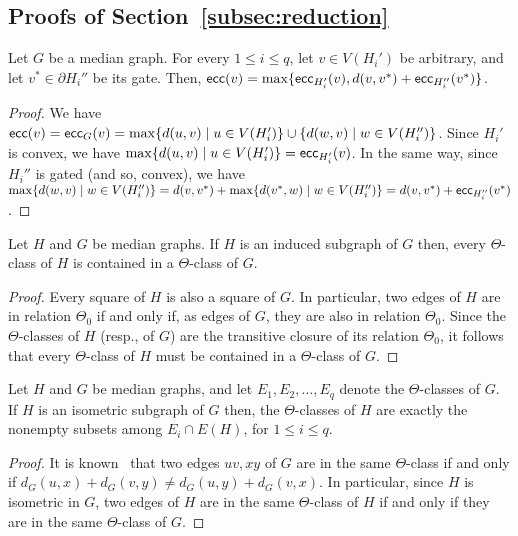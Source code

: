 \documentclass[a4paper,UKenglish,numberwithinsect,cleveref, autoref,anonymous]{lipics-v2021}
\newcommand{\ecc}{\mbox{\textsf{ecc}}}
\begin{document}
\subsection{Proofs of Section~\ref{subsec:reduction}} \label{asubsec:reduction}

\begin{lemma}\label{lem:guigui-1}
Let $G$ be a median graph.
For every $1 \leq i \leq q$, let $v \in V(H_i')$ be arbitrary, and let $v^* \in \partial H_i''$ be its gate.
Then, $\ecc(v) = \max\{\ecc_{H_i'}(v), d(v,v^*) + \ecc_{H_i''}(v^*)\}$.
\end{lemma}
\begin{proof}
We have $\ecc(v) = \ecc_G(v) = \max\{d(u,v) \mid u \in V(H_i')\} \cup \{d(w,v) \mid w \in V(H_i'')\}$.
Since $H_i'$ is convex, we have $\max\{d(u,v) \mid u \in V(H_i')\} = \ecc_{H_i'}(v)$.
In the same way, since $H_i''$ is gated (and so, convex), we have $\max\{d(w,v) \mid w \in V(H_i'')\} = d(v,v^*) + \max\{d(v^*,w) \mid w \in V(H_i'')\} = d(v,v^*) + \ecc_{H_i''}(v^*)$.
\end{proof}

\begin{lemma}\label{lem:guigui-2}
Let $H$ and $G$ be median graphs.
If $H$ is an induced subgraph of $G$ then, every $\Theta$-class of $H$ is contained in a $\Theta$-class of $G$.
\end{lemma}
\begin{proof}
Every square of $H$ is also a square of $G$.
In particular, two edges of $H$ are in relation $\Theta_0$ if and only if, as edges of $G$, they are also in relation $\Theta_0$.
Since the $\Theta$-classes of $H$ (resp., of $G$) are the transitive closure of its relation $\Theta_0$, it follows that every $\Theta$-class of $H$ must be contained in a $\Theta$-class of $G$.
\end{proof}

\begin{lemma}\label{lem:guigui-2bis}
Let $H$ and $G$ be median graphs, and let $E_1,E_2,\ldots,E_q$ denote the $\Theta$-classes of $G$.
If $H$ is an isometric subgraph of $G$ then, the $\Theta$-classes of $H$ are exactly the nonempty subsets among $E_i \cap E(H)$, for $1 \leq i \leq q$.
\end{lemma}
\begin{proof}
It is known~\cite{winkler1984isometric} that two edges $uv,xy$ of $G$ are in the same $\Theta$-class if and only if $d_G(u,x) + d_G(v,y) \neq d_G(u,y) + d_G(v,x)$.
In particular, since $H$ is isometric in $G$, two edges of $H$ are in the same $\Theta$-class of $H$ if and only if they are in the same $\Theta$-class of $G$.
\end{proof}
\end{document}
